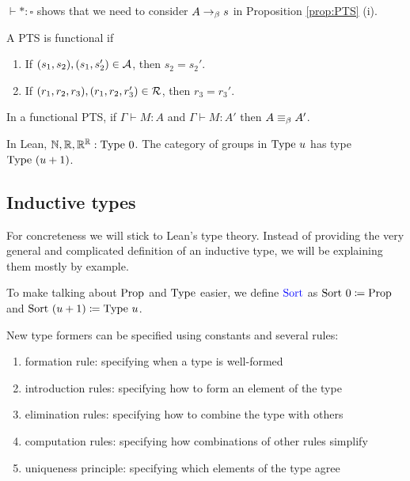 \begin{rem}
    $\vdash * : \square$ shows that we need to consider $A \to_{\beta} s$ in Proposition \ref{prop:PTS} (i).
\end{rem}

\begin{boxdefi}
    A PTS is \alert{functional} if 
    \begin{enumerate}
        \item If $(s_1, s_2), (s_1, s_2') \in \mathcal{A}$, then $s_2 =s_2'$.
        \item If $(r_1, r_2, r_3), (r_1, r_2, r_3') \in \mathcal{R}$, then $r_3 = r_3'$.
    \end{enumerate}
\end{boxdefi}

\begin{boxthm}
    In a functional PTS, if $\Gamma \vdash M : A$ and $\Gamma \vdash M : A'$ then $A \equiv_{\beta} A'$.
\end{boxthm}

\begin{rem}
    In Lean, $\mathbb{N}, \mathbb{R}, \mathbb{R}^{\mathbb{R}} : \mathrm{Type}\ 0$. 
    The category of groups in $\mathrm{Type}\ u$ has type $\mathrm{Type}\ (u + 1)$.
\end{rem}

\subsection{Inductive types}

For concreteness we will stick to Lean's type theory. 
Instead of providing the very general and complicated definition of an inductive type, we will be explaining them mostly by example. 

\begin{rem}
    To make talking about $\mathrm{Prop}$ and $\mathrm{Type}$ easier, we define $\alert{\sort}$ as $\mathrm{Sort}\ 0 \coloneq \mathrm{Prop}$ and $\mathrm{Sort}\ (u + 1) \coloneq \mathrm{Type}\ u$.
\end{rem}

\begin{boxdefi}
    New type formers can be specified using constants and several rules: 
    \begin{enumerate}
        \item \alert{formation rule}: specifying when a type is well-formed
        \item \alert{introduction rules}: specifying how to form an element of the type
        \item \alert{elimination rules}: specifying how to combine the type with others
        \item \alert{computation rules}: specifying how combinations of other rules simplify
        \item \alert{uniqueness principle}: specifying which elements of the type agree
    \end{enumerate}
\end{boxdefi}

